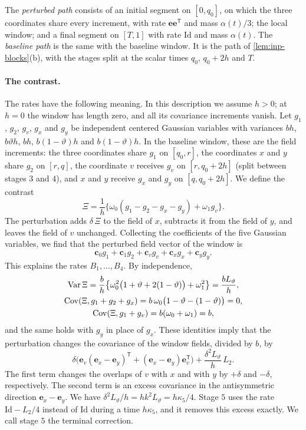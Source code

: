 The \emph{perturbed path} consists of an initial segment on $[0,q_0]$, on
which the three coordinates share every increment, with rate
$\mathbf e\mathbf e^{\mathsf T}$ and mass $\alpha(t)/3$; the local window;
and a final segment on $[T,1]$ with rate $\mathrm{Id}$ and mass $\alpha(t)$. The
\emph{baseline path} is the same with the baseline window. It is the path of
\cref{lem:inp-blocks}(b), with the stages split at the scalar times $q_0$,
$q_0+2h$ and $T$.

\paragraph{The contrast.} The rates have the following meaning. In this
description we assume $h>0$; at $h=0$ the window has length zero, and all its
covariance increments vanish. Let $g_1$,
$g_2$, $g_v$, $g_x$ and $g_y$ be independent centered Gaussian variables with
variances $bh$, $b\vartheta h$, $bh$, $b(1-\vartheta)h$ and
$b(1-\vartheta)h$. In the baseline window, these are the field increments: the
three coordinates share $g_1$ on $[q_0,r]$, the coordinates $x$ and $y$ share
$g_2$ on $[r,q]$, the coordinate $v$ receives $g_v$ on $[r,q_0+2h]$ (split
between stages $3$ and $4$), and $x$ and $y$ receive $g_x$ and $g_y$ on
$[q,q_0+2h]$. We define the contrast
\begin{equation}\label{eq:cub-contrast}
 \Xi=\frac1h\bigl\{\omega_0(g_1-g_2-g_x-g_y)+\omega_1g_v\bigr\}.
\end{equation}
The perturbation adds $\delta\,\Xi$ to the field of $x$, subtracts it from the
field of $y$, and leaves the field of $v$ unchanged. Collecting the
coefficients of the five Gaussian variables, we find that the perturbed field
vector of the window is
\[
 \mathbf c_0g_1+\mathbf c_1g_2+\mathbf c_vg_v+\mathbf c_xg_x+\mathbf c_yg_y.
\]
This explains the rates $B_1,\dots,B_4$. By independence,
\begin{equation}\label{eq:cub-contrast-moments}
\begin{gathered}
 \operatorname{Var}\Xi=\frac bh\bigl\{\omega_0^2\bigl(1+\vartheta+2(1-\vartheta)\bigr)+\omega_1^2\bigr\}
 =\frac{bL_\vartheta}h,\\
 \operatorname{Cov}(\Xi,g_1+g_2+g_x)=b\,\omega_0\bigl(1-\vartheta-(1-\vartheta)\bigr)=0,\\
 \operatorname{Cov}(\Xi,g_1+g_v)=b(\omega_0+\omega_1)=b,
\end{gathered}
\end{equation}
and the same holds with $g_y$ in place of $g_x$. These identities imply that
the perturbation changes the covariance of the window fields, divided by $b$, by
\[
 \delta\bigl(\mathbf e_v(\mathbf e_x-\mathbf e_y)^{\mathsf T}
 +(\mathbf e_x-\mathbf e_y)\mathbf e_v^{\mathsf T}\bigr)
 +\frac{\delta^2L_\vartheta}h\,L_2.
\]
The first term changes the overlaps of $v$ with $x$ and with $y$ by $+\delta$
and $-\delta$, respectively. The second term is an excess covariance in the antisymmetric direction
$\mathbf e_x-\mathbf e_y$.
We have $\delta^2L_\vartheta/h=hk^2L_\vartheta=h\kappa_5/4$. Stage $5$ uses the
rate $\mathrm{Id}-L_2/4$ instead of $\mathrm{Id}$ during a time $h\kappa_5$, and it removes this
excess exactly. We call stage $5$ the terminal correction.

